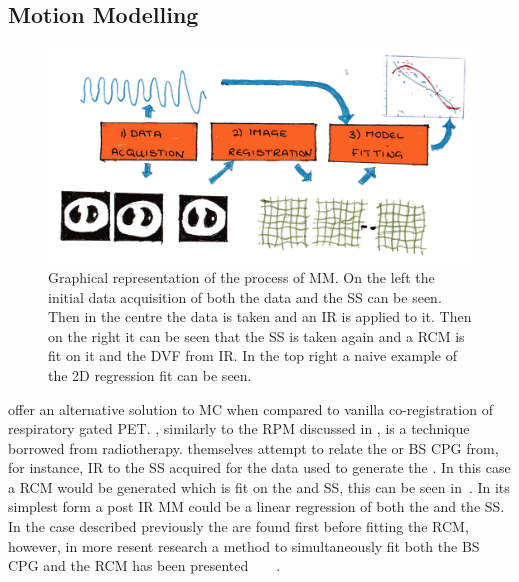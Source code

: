         \subsection{Motion Modelling} \label{sec:motion_modelling}
            \begin{figure}
                \centering
                        
                \includegraphics[width=1.0\linewidth]{figures/background_motion_model.png}
                        
                \captionsetup{singlelinecheck=false, justification=raggedright}
                \caption{Graphical representation of the process of \gls{MM}. On the left the initial data acquisition of both the data and the \gls{SS} can be seen. Then in the centre the data is taken and an \gls{IR} is applied to it. Then on the right it can be seen that the \gls{SS} is taken again and a \gls{RCM} is fit on it and the \gls{DVF} from \gls{IR}. In the top right a naive example of the \gls{2D} regression fit can be seen.} \label{fig:motion_modelling_motion_model}
            \end{figure}
            
             offer an alternative solution to \gls{MC} when compared to vanilla co-registration of respiratory gated \gls{PET}. , similarly to the \gls{RPM} discussed in , is a technique borrowed from radiotherapy.  themselves attempt to relate the  or \gls{BS} \gls{CPG} from, for instance, \gls{IR} to the \gls{SS} acquired for the data used to generate the . In this case a \gls{RCM} would be generated which is fit on the  and \gls{SS}, this can be seen in~. In its simplest form a post \gls{IR} \gls{MM} could be a linear regression of both the  and the \gls{SS}. In the case described previously the  are found first before fitting the \gls{RCM}, however, in more resent research a method to simultaneously fit both the \gls{BS} \gls{CPG} and the \gls{RCM} has been presented~~~~.
            
